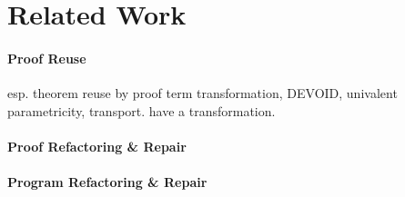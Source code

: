 \section{Related Work}

\paragraph{Proof Reuse}

esp. theorem reuse by proof term transformation, DEVOID, univalent parametricity, transport. \cite{magaud2000changing} have a transformation.

\paragraph{Proof Refactoring \& Repair}

\paragraph{Program Refactoring \& Repair}
